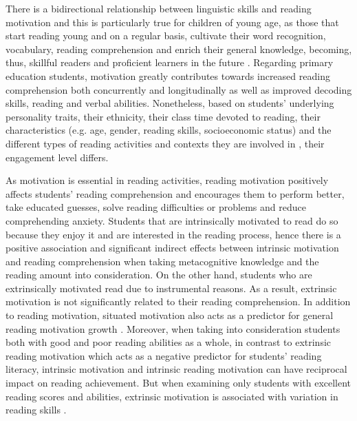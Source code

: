 \documentclass[english]{textolivre}
\begin{document}
There is a bidirectional relationship between linguistic skills and reading motivation and this is particularly true for children of young age, as those that start reading young and on a regular basis, cultivate their word recognition, vocabulary, reading comprehension and enrich their general knowledge, becoming, thus, skillful readers and proficient learners in the future \cite{morgan_is_2007}. Regarding primary education students, motivation greatly contributes towards increased reading comprehension both concurrently and longitudinally as well as improved decoding skills, reading and verbal abilities. Nonetheless, based on students’ underlying personality traits, their ethnicity, their class time devoted to reading, their characteristics (e.g. age, gender, reading skills, socioeconomic status) and the different types of reading activities and contexts they are involved in \cite{ramos-navas-parejo_validation_2022}, their engagement level differs.

As motivation is essential in reading activities, reading motivation positively affects students’ reading comprehension and encourages them to perform better, take educated guesses, solve reading difficulties or problems and reduce comprehending anxiety. Students that are intrinsically motivated to read do so because they enjoy it and are interested in the reading process, hence there is a positive association and significant indirect effects between intrinsic motivation and reading comprehension when taking metacognitive knowledge and the reading amount into consideration. On the other hand, students who are extrinsically motivated read due to instrumental reasons. As a result, extrinsic motivation is not significantly related to their reading comprehension. In addition to reading motivation, situated motivation also acts as a predictor for general reading motivation growth \cite{guthrie_influences_2006}. Moreover, when taking into consideration students both with good and poor reading abilities as a whole, in contrast to extrinsic reading motivation which acts as a negative predictor for students’ reading literacy, intrinsic motivation and intrinsic reading motivation can have reciprocal impact on reading achievement. But when examining only students with excellent reading scores and abilities, extrinsic motivation is associated with variation in reading skills \cite{hebbecker_reciprocal_2019}.
\end{document}
